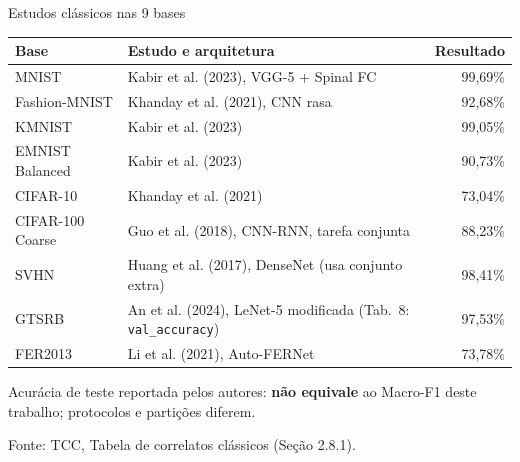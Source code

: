 \documentclass[aspectratio=169,11pt,brazil]{beamer}
\newcommand{\fonte}[1]{\par\vfill{\tiny\color{gray}Fonte: #1\par}}
\begin{document}
\begin{frame}{Estudos clássicos nas 9 bases}
  \centering
  \scriptsize
  \begin{tabular}{@{}lp{4.9cm}r@{}}
    \toprule
    \textbf{Base} & \textbf{Estudo e arquitetura} & \textbf{Resultado} \\
    \midrule
    MNIST & Kabir et al. (2023), VGG-5 + Spinal FC & 99,69\% \\
    Fashion-MNIST & Khanday et al. (2021), CNN rasa & 92,68\% \\
    KMNIST & Kabir et al. (2023) & 99,05\% \\
    EMNIST Balanced & Kabir et al. (2023) & 90,73\% \\
    CIFAR-10 & Khanday et al. (2021) & 73,04\% \\
    CIFAR-100 Coarse & Guo et al. (2018), CNN-RNN, tarefa conjunta & 88,23\% \\
    SVHN & Huang et al. (2017), DenseNet (usa conjunto extra) & 98,41\% \\
    GTSRB & An et al. (2024), LeNet-5 modificada (Tab.~8: \texttt{val\_accuracy}) & 97,53\% \\
    FER2013 & Li et al. (2021), Auto-FERNet & 73,78\% \\
    \bottomrule
  \end{tabular}

  \vspace{0.2cm}
  \footnotesize Acurácia de teste reportada pelos autores: \textbf{não equivale} ao Macro-F1 deste trabalho; protocolos e partições diferem.
  \fonte{TCC, Tabela de correlatos clássicos (Seção 2.8.1).}
\end{frame}
\end{document}
